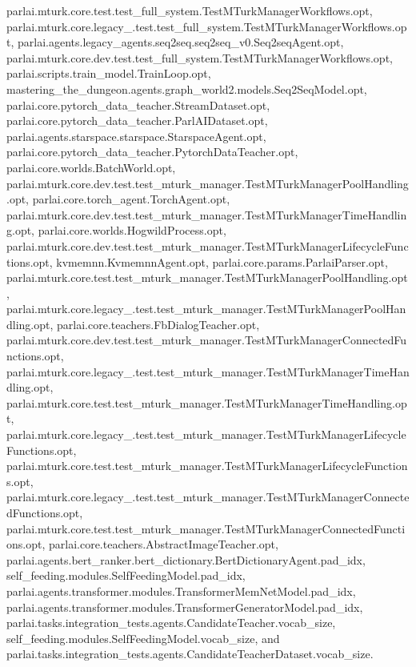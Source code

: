 parlai.\+mturk.\+core.\+test.\+test\+\_\+full\+\_\+system.\+Test\+M\+Turk\+Manager\+Workflows.\+opt, parlai.\+mturk.\+core.\+legacy\+\_.\+test.\+test\+\_\+full\+\_\+system.\+Test\+M\+Turk\+Manager\+Workflows.\+opt, parlai.\+agents.\+legacy\+\_\+agents.\+seq2seq.\+seq2seq\+\_\+v0.\+Seq2seq\+Agent.\+opt, parlai.\+mturk.\+core.\+dev.\+test.\+test\+\_\+full\+\_\+system.\+Test\+M\+Turk\+Manager\+Workflows.\+opt, parlai.\+scripts.\+train\+\_\+model.\+Train\+Loop.\+opt, mastering\+\_\+the\+\_\+dungeon.\+agents.\+graph\+\_\+world2.\+models.\+Seq2\+Seq\+Model.\+opt, parlai.\+core.\+pytorch\+\_\+data\+\_\+teacher.\+Stream\+Dataset.\+opt, parlai.\+core.\+pytorch\+\_\+data\+\_\+teacher.\+Parl\+A\+I\+Dataset.\+opt, parlai.\+agents.\+starspace.\+starspace.\+Starspace\+Agent.\+opt, parlai.\+core.\+pytorch\+\_\+data\+\_\+teacher.\+Pytorch\+Data\+Teacher.\+opt, parlai.\+core.\+worlds.\+Batch\+World.\+opt, parlai.\+mturk.\+core.\+dev.\+test.\+test\+\_\+mturk\+\_\+manager.\+Test\+M\+Turk\+Manager\+Pool\+Handling.\+opt, parlai.\+core.\+torch\+\_\+agent.\+Torch\+Agent.\+opt, parlai.\+mturk.\+core.\+dev.\+test.\+test\+\_\+mturk\+\_\+manager.\+Test\+M\+Turk\+Manager\+Time\+Handling.\+opt, parlai.\+core.\+worlds.\+Hogwild\+Process.\+opt, parlai.\+mturk.\+core.\+dev.\+test.\+test\+\_\+mturk\+\_\+manager.\+Test\+M\+Turk\+Manager\+Lifecycle\+Functions.\+opt, kvmemnn.\+Kvmemnn\+Agent.\+opt, parlai.\+core.\+params.\+Parlai\+Parser.\+opt, parlai.\+mturk.\+core.\+test.\+test\+\_\+mturk\+\_\+manager.\+Test\+M\+Turk\+Manager\+Pool\+Handling.\+opt, parlai.\+mturk.\+core.\+legacy\+\_.\+test.\+test\+\_\+mturk\+\_\+manager.\+Test\+M\+Turk\+Manager\+Pool\+Handling.\+opt, parlai.\+core.\+teachers.\+Fb\+Dialog\+Teacher.\+opt, parlai.\+mturk.\+core.\+dev.\+test.\+test\+\_\+mturk\+\_\+manager.\+Test\+M\+Turk\+Manager\+Connected\+Functions.\+opt, parlai.\+mturk.\+core.\+legacy\+\_.\+test.\+test\+\_\+mturk\+\_\+manager.\+Test\+M\+Turk\+Manager\+Time\+Handling.\+opt, parlai.\+mturk.\+core.\+test.\+test\+\_\+mturk\+\_\+manager.\+Test\+M\+Turk\+Manager\+Time\+Handling.\+opt, parlai.\+mturk.\+core.\+legacy\+\_.\+test.\+test\+\_\+mturk\+\_\+manager.\+Test\+M\+Turk\+Manager\+Lifecycle\+Functions.\+opt, parlai.\+mturk.\+core.\+test.\+test\+\_\+mturk\+\_\+manager.\+Test\+M\+Turk\+Manager\+Lifecycle\+Functions.\+opt, parlai.\+mturk.\+core.\+legacy\+\_.\+test.\+test\+\_\+mturk\+\_\+manager.\+Test\+M\+Turk\+Manager\+Connected\+Functions.\+opt, parlai.\+mturk.\+core.\+test.\+test\+\_\+mturk\+\_\+manager.\+Test\+M\+Turk\+Manager\+Connected\+Functions.\+opt, parlai.\+core.\+teachers.\+Abstract\+Image\+Teacher.\+opt, parlai.\+agents.\+bert\+\_\+ranker.\+bert\+\_\+dictionary.\+Bert\+Dictionary\+Agent.\+pad\+\_\+idx, self\+\_\+feeding.\+modules.\+Self\+Feeding\+Model.\+pad\+\_\+idx, parlai.\+agents.\+transformer.\+modules.\+Transformer\+Mem\+Net\+Model.\+pad\+\_\+idx, parlai.\+agents.\+transformer.\+modules.\+Transformer\+Generator\+Model.\+pad\+\_\+idx, parlai.\+tasks.\+integration\+\_\+tests.\+agents.\+Candidate\+Teacher.\+vocab\+\_\+size, self\+\_\+feeding.\+modules.\+Self\+Feeding\+Model.\+vocab\+\_\+size, and parlai.\+tasks.\+integration\+\_\+tests.\+agents.\+Candidate\+Teacher\+Dataset.\+vocab\+\_\+size.

